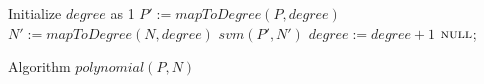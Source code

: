 \begin{algorithm}[t]
\SetAlgoVlined
\Indm
\Indp
    Initialize $degree$ as 1\;
     {
        $P' := \mathit{mapToDegree}(P, \mathit{degree})$\;
        $N' := \mathit{mapToDegree}(N, \mathit{degree})$\;
         {
            \Return $\mathit{svm}(P', N')$\;
        }
    	$\mathit{degree} := \mathit{degree} + 1$\;
    }
    \Return $\textsc{null}$;
\caption{Algorithm $\mathit{polynomial}(P,N)$}
\label{alg:polynomialSVM}
\end{algorithm}






